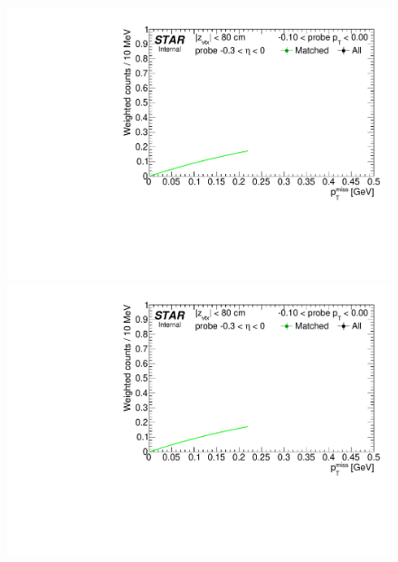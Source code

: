 \begin{figure}[ht]\ContinuedFloat
\centering
\parbox{0.24\textwidth}{ 
  \centering
  \includegraphics[width=\linewidth,page=7]{graphics/correctionsToEff/TOF_tagAndProbe/Fitting_effVsPt_data_ETABINS_C.CPT2.pdf}\\
  \includegraphics[width=\linewidth,page=9]{graphics/correctionsToEff/TOF_tagAndProbe/Fitting_effVsPt_data_ETABINS_C.CPT2.pdf}\\
}
\end{figure}

